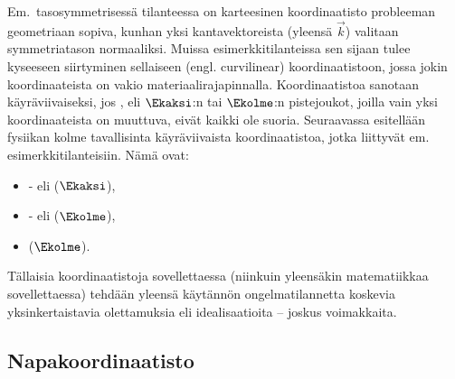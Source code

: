 Em.\ tasosymmetrisessä tilanteessa on karteesinen koordinaatisto probleeman 
geometriaan sopiva, kunhan yksi kantavektoreista (yleensä $\vec k$) valitaan symmetriatason
normaaliksi. Muissa esimerkkitilanteissa sen sijaan tulee kyseeseen siirtyminen sellaiseen 
 (engl. curvilinear) koordinaatistoon, jossa jokin koordinaateista on vakio 
materiaalirajapinnalla. Koordinaatistoa sanotaan käyräviivaiseksi, jos ,
eli $\Ekaksi$:n tai $\Ekolme$:n pistejoukot, joilla vain yksi koordinaateista on muuttuva, eivät
kaikki ole suoria. Seuraavassa esitellään fysiikan kolme tavallisinta käyräviivaista 
koordinaatistoa, jotka liittyvät em. esimerkkitilanteisiin. Nämä ovat:
\begin{itemize}
\item  {}- eli  ($\Ekaksi$),
\item  {}- eli  ($\Ekolme$),
\item  {} ($\Ekolme$).
\end{itemize}
Tällaisia koordinaatistoja sovellettaessa (niinkuin yleensäkin matematiikkaa sovellettaessa) 
tehdään yleensä käytännön ongelmatilannetta koskevia yksinkertaistavia olettamuksia eli 
idealisaatioita -- joskus voimakkaita.

\subsection{Napakoordinaatisto}

